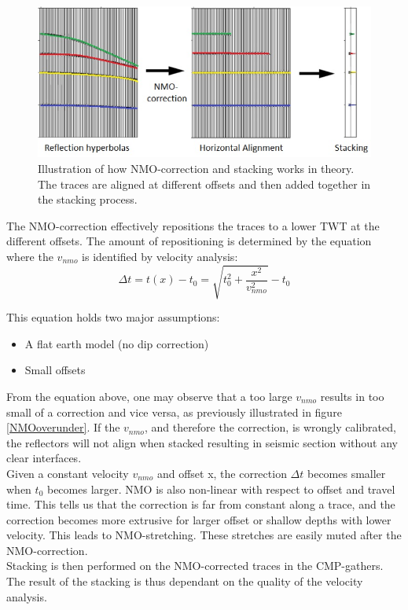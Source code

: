 \documentclass[10pt,a4paper]{article}
\begin{document}
\begin{figure}[H]
\includegraphics[scale=0.4]{NMOcorr_stacking.jpg}
\caption{Illustration of how NMO-correction and stacking works in theory. The traces are aligned at different offsets and then added together in the stacking process.}
\label{NMOS}
\end{figure}

\newpage

\noindent The NMO-correction effectively repositions the traces to a lower TWT at the different offsets. The amount of repositioning is determined by the equation where the $v_{nmo}$ is identified by velocity analysis:
$$
\Delta t = t(x) - t_0 = \sqrt{t_0^2 + \frac{x^2}{v_{nmo}^2}}-t_0
$$

\noindent This equation holds two major assumptions:

\begin{itemize}
    \item A flat earth model (no dip correction)
    \item Small offsets
\end{itemize}

\noindent From the equation above, one may observe that a too large $v_{nmo}$ results in too small of a correction and vice versa, as previously illustrated in figure \ref{NMOoverunder}. If the $v_{nmo}$, and therefore the correction, is wrongly calibrated, the reflectors will not align when stacked resulting in seismic section without any clear interfaces. 
\\
Given a constant velocity $v_{nmo}$ and offset x, the correction $\Delta t$ becomes smaller when $t_0$ becomes larger. NMO is also non-linear with respect to offset and travel time. This tells us that the correction is far from constant along a trace, and the correction becomes more extrusive for larger offset or shallow depths with lower velocity. This leads to NMO-stretching. These stretches are easily muted after the NMO-correction.
\\
Stacking is then performed on the NMO-corrected traces in the CMP-gathers. The result of the stacking is thus dependant on the quality of the velocity analysis.
\end{document}

